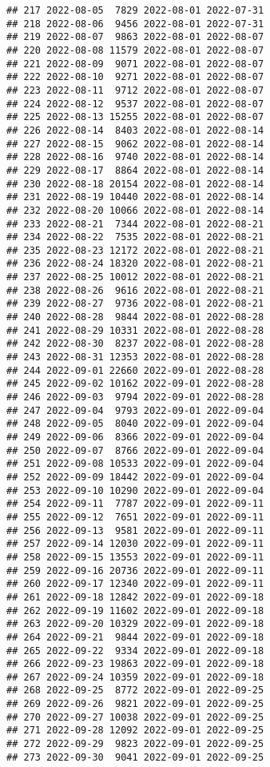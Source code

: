 \documentclass[
]{article}
\begin{document}
\begin{verbatim}
## 217 2022-08-05  7829 2022-08-01 2022-07-31
## 218 2022-08-06  9456 2022-08-01 2022-07-31
## 219 2022-08-07  9863 2022-08-01 2022-08-07
## 220 2022-08-08 11579 2022-08-01 2022-08-07
## 221 2022-08-09  9071 2022-08-01 2022-08-07
## 222 2022-08-10  9271 2022-08-01 2022-08-07
## 223 2022-08-11  9712 2022-08-01 2022-08-07
## 224 2022-08-12  9537 2022-08-01 2022-08-07
## 225 2022-08-13 15255 2022-08-01 2022-08-07
## 226 2022-08-14  8403 2022-08-01 2022-08-14
## 227 2022-08-15  9062 2022-08-01 2022-08-14
## 228 2022-08-16  9740 2022-08-01 2022-08-14
## 229 2022-08-17  8864 2022-08-01 2022-08-14
## 230 2022-08-18 20154 2022-08-01 2022-08-14
## 231 2022-08-19 10440 2022-08-01 2022-08-14
## 232 2022-08-20 10066 2022-08-01 2022-08-14
## 233 2022-08-21  7344 2022-08-01 2022-08-21
## 234 2022-08-22  7535 2022-08-01 2022-08-21
## 235 2022-08-23 12172 2022-08-01 2022-08-21
## 236 2022-08-24 18320 2022-08-01 2022-08-21
## 237 2022-08-25 10012 2022-08-01 2022-08-21
## 238 2022-08-26  9616 2022-08-01 2022-08-21
## 239 2022-08-27  9736 2022-08-01 2022-08-21
## 240 2022-08-28  9844 2022-08-01 2022-08-28
## 241 2022-08-29 10331 2022-08-01 2022-08-28
## 242 2022-08-30  8237 2022-08-01 2022-08-28
## 243 2022-08-31 12353 2022-08-01 2022-08-28
## 244 2022-09-01 22660 2022-09-01 2022-08-28
## 245 2022-09-02 10162 2022-09-01 2022-08-28
## 246 2022-09-03  9794 2022-09-01 2022-08-28
## 247 2022-09-04  9793 2022-09-01 2022-09-04
## 248 2022-09-05  8040 2022-09-01 2022-09-04
## 249 2022-09-06  8366 2022-09-01 2022-09-04
## 250 2022-09-07  8766 2022-09-01 2022-09-04
## 251 2022-09-08 10533 2022-09-01 2022-09-04
## 252 2022-09-09 18442 2022-09-01 2022-09-04
## 253 2022-09-10 10290 2022-09-01 2022-09-04
## 254 2022-09-11  7787 2022-09-01 2022-09-11
## 255 2022-09-12  7651 2022-09-01 2022-09-11
## 256 2022-09-13  9581 2022-09-01 2022-09-11
## 257 2022-09-14 12030 2022-09-01 2022-09-11
## 258 2022-09-15 13553 2022-09-01 2022-09-11
## 259 2022-09-16 20736 2022-09-01 2022-09-11
## 260 2022-09-17 12340 2022-09-01 2022-09-11
## 261 2022-09-18 12842 2022-09-01 2022-09-18
## 262 2022-09-19 11602 2022-09-01 2022-09-18
## 263 2022-09-20 10329 2022-09-01 2022-09-18
## 264 2022-09-21  9844 2022-09-01 2022-09-18
## 265 2022-09-22  9334 2022-09-01 2022-09-18
## 266 2022-09-23 19863 2022-09-01 2022-09-18
## 267 2022-09-24 10359 2022-09-01 2022-09-18
## 268 2022-09-25  8772 2022-09-01 2022-09-25
## 269 2022-09-26  9821 2022-09-01 2022-09-25
## 270 2022-09-27 10038 2022-09-01 2022-09-25
## 271 2022-09-28 12092 2022-09-01 2022-09-25
## 272 2022-09-29  9823 2022-09-01 2022-09-25
## 273 2022-09-30  9041 2022-09-01 2022-09-25

\end{verbatim}
\end{document}
